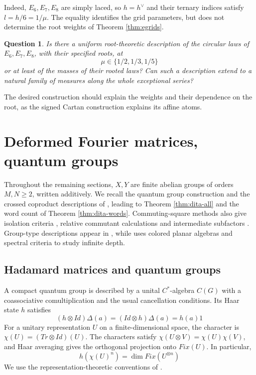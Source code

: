 \documentclass[11pt,reqno]{amsart}
\newtheorem{quest}[thm]{Question}
\theoremstyle{definition}
\numberwithin{equation}{section}
\begin{document}
Indeed, $E_6,E_7,E_8$ are simply laced, so $h=h^\vee$ and their ternary indices satisfy $l=h/6=1/\mu$. The equality identifies the grid parameters, but does not determine the root weights of Theorem \ref{thm:egrids}.

\begin{quest}\label{q:exceptional}
Is there a uniform root-theoretic description of the circular laws of $E_6,E_7,E_8$, with their specified roots, at
$$\mu\in\{1/2,1/3,1/5\}$$
or at least of the masses of their rooted laws? Can such a description extend to a natural family of measures along the whole exceptional series?
\end{quest}

The desired construction should explain the weights and their dependence on the root, as the signed Cartan construction explains its affine atoms.

\section{Deformed Fourier matrices, quantum groups}\label{sec:hadamard}

Throughout the remaining sections, $X,Y$ are finite abelian groups of orders $M,N\geq2$, written additively. We recall the quantum group construction and the crossed coproduct descriptions of \cite{BBi15,Bic15,BO26}, leading to Theorem \ref{thm:dita-all} and the word count of Theorem \ref{thm:dita-words}. Commuting-square methods also give isolation criteria \cite{Nic06}, relative commutant calculations and intermediate subfactors \cite{Nic10}. Group-type descriptions appear in \cite{Bur15}, while \cite{Mon23} uses colored planar algebras and spectral criteria to study infinite depth.

\subsection{Hadamard matrices and quantum groups}\label{sec:prelim-cqg}

A compact quantum group is described by a unital $C^*$-algebra $C(G)$ with a coassociative comultiplication and the usual cancellation conditions. Its Haar state $h$ satisfies
$$(h\otimes Id)\Delta(a)=(Id\otimes h)\Delta(a)=h(a)1$$
For a unitary representation $U$ on a finite-dimensional space, the character is $\chi(U)=(Tr\otimes Id)(U)$. The characters satisfy $\chi(U\otimes V)=\chi(U)\chi(V)$, and Haar averaging gives the orthogonal projection onto $Fix(U)$. In particular,
$$h(\chi(U)^n)=\dim Fix(U^{\otimes n})$$
We use the representation-theoretic conventions of \cite{NT13}.
\end{document}
